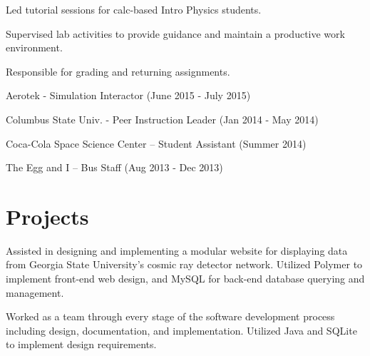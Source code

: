 \documentclass[]{deedy-resume-openfont}
\begin{document}
\begin{minipage}[t]{0.66\textwidth}
\begin{tightemize}
\item Led tutorial sessions for calc-based Intro Physics students.
\item Supervised lab activities to provide guidance and maintain a productive work environment.
\item Responsible for grading and returning assignments.
\end{tightemize}
\sectionsep

\begin{tightemize}
\item Aerotek - Simulation Interactor (June 2015 - July 2015)
\item Columbus State Univ. - Peer Instruction Leader (Jan 2014 - May 2014)
\item Coca-Cola Space Science Center – Student Assistant  (Summer 2014)
\item The Egg and I – Bus Staff  (Aug 2013 - Dec 2013)
\end{tightemize}
\sectionsep


\section{Projects}
Assisted in designing and implementing a modular website for displaying data from Georgia State University's cosmic ray detector network. Utilized Polymer to implement front-end web design, and MySQL for back-end database querying and management.
\sectionsep

Worked as a team through every stage of the software development process including design, documentation, and implementation. Utilized Java and SQLite to implement design requirements.
\sectionsep

\end{minipage} 
\end{document}
